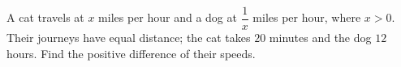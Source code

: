 A cat travels at $x$ miles per hour and a dog at $\dfrac{1}{x}$ miles per hour, where $x>0$. Their journeys have equal distance; the cat takes $20$ minutes and the dog $12$ hours. Find the positive difference of their speeds.
